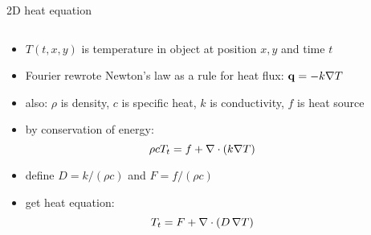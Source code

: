 \begin{frame}{2D heat equation}

\begin{columns}
\begin{column}{0.6\textwidth}
\begin{itemize}
\item $T(t,x,y)$ is temperature in object at position $x,y$ and time $t$
\item Fourier rewrote Newton's law as a rule for heat flux: $\mathbf{q} = - k \nabla T$
\item also: $\rho$ is density, $c$ is specific heat, $k$ is conductivity, $f$ is heat source
\item by conservation of energy:
	$$\rho c T_t = f + \nabla\cdot (k \nabla T)$$
\item define $D = k/(\rho c)$ and $F = f/(\rho c)$
\item get heat equation:
\begin{equation}
T_t = F + \nabla\cdot (D\, \nabla T) \label{heat}
\end{equation}
\end{itemize}
\end{column}

\begin{column}{0.4\textwidth}
\end{column}
\end{columns}
\end{frame}


